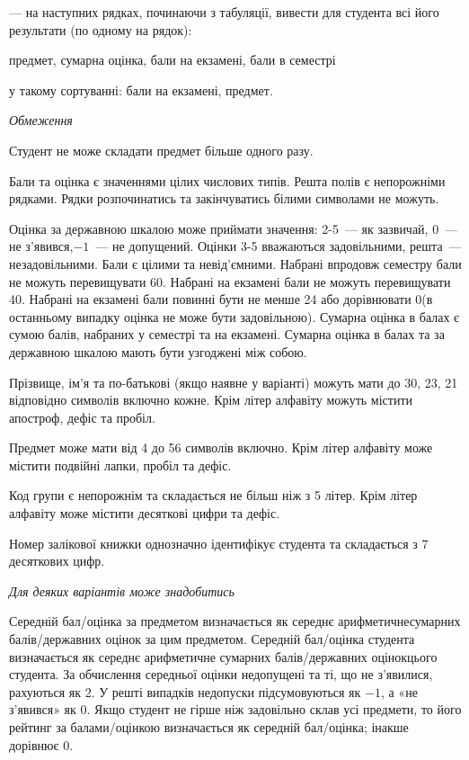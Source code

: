 \documentclass[11pt, ukrainian]{article}
\begin{document}
{\noindent}--- на наступних рядках, починаючи з табуляції, вивести для студента всі його результати (по одному на рядок):\par
предмет, сумарна оцінка, бали на екзамені, бали в семестрі

{\noindent}у такому сортуванні: бали на екзамені, предмет.


\bigskip\textit{Обмеження}

Студент не може складати предмет більше одного разу.

Бали та оцінка є значеннями цілих числових типів. Решта полів є непорожніми рядками.
Рядки розпочинатись та закінчуватись білими символами не можуть.

Оцінка за державною шкалою може приймати значення: 2-5~--- як зазвичай, 0~--- не з’явився,$-1$~--- не допущений. 
Оцінки 3-5 вважаються задовільними, решта~--- незадовільними. 
Бали є цілими та невід’ємними.
Набрані впродовж семестру бали не можуть перевищувати 60. 
Набрані на екзамені бали не можуть перевищувати 40. 
Набрані на екзамені бали повинні бути не менше 24 або дорівнювати 0(в останньому випадку оцінка не може бути задовільною). 
Сумарна оцінка в балах є сумою балів, набраних у семестрі та на екзамені.
Сумарна оцінка в балах та за державною шкалою мають бути узгоджені між собою.

Прізвище, ім’я та по-батькові (якщо наявне у варіанті) можуть мати до 30, 23, 21 відповідно символів включно кожне. 
Крім літер алфавіту можуть містити апостроф, дефіс та пробіл.

Предмет може мати від 4 до 56 символів включно. 
Крім літер алфавіту може містити подвійні лапки, пробіл та дефіс.

Код групи є непорожнім та складається не більш ніж з 5 літер. 
Крім літер алфавіту може містити десяткові цифри та дефіс.


Номер залікової книжки однозначно ідентифікує студента та складається з 7 десяткових цифр. 

\bigskip\textit{Для деяких варіантів може знадобитись}

Середній бал/оцінка за предметом визначається як середнє арифметичнесумарних балів/державних оцінок за цим предметом. 
Середній бал/оцінка студента визначається як середнє арифметичне сумарних балів/державних оцінокцього студента. 
За обчислення середньої оцінки недопущені та ті, що не з’явилися, рахуються як 2.
У решті випадків недопуски підсумовуються як $-1$, а «не з’явився» як 0.
Якщо студент не гірше ніж задовільно склав усі предмети, 
то його рейтинг за балами/оцінкою визначається як середній бал/оцінка; інакше дорівнює 0.
\end{document}
